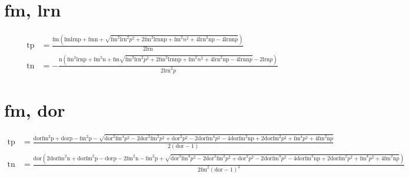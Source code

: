 \documentclass[3p,times]{elsarticle}
\begin{document}
\begin{footnotesize}
\begin{landscape}
\section{fm, lrn}
\begin{align}
\mathrm{tp} &= \frac{\mathrm{fm} \left(\mathrm{fm} \mathrm{lrn} \mathrm{p} + \mathrm{fm} \mathrm{n} + \sqrt{\mathrm{fm}^{2} \mathrm{lrn}^{2} p^{2} + 2 \mathrm{fm}^{2} \mathrm{lrn} \mathrm{n} \mathrm{p} + \mathrm{fm}^{2} n^{2} + 4 \mathrm{lrn}^{2} \mathrm{n} \mathrm{p} - 4 \mathrm{lrn} \mathrm{n} p}\right)}{2 \mathrm{lrn}}\\
\mathrm{tn} &= - \frac{\mathrm{n} \left(\mathrm{fm}^{2} \mathrm{lrn} \mathrm{p} + \mathrm{fm}^{2} \mathrm{n} + \mathrm{fm} \sqrt{\mathrm{fm}^{2} \mathrm{lrn}^{2} p^{2} + 2 \mathrm{fm}^{2} \mathrm{lrn} \mathrm{n} \mathrm{p} + \mathrm{fm}^{2} n^{2} + 4 \mathrm{lrn}^{2} \mathrm{n} \mathrm{p} - 4 \mathrm{lrn} \mathrm{n} p} - 2 \mathrm{lrn} p\right)}{2 \mathrm{lrn}^{2} p}
\end{align}
\section{fm, dor}
\begin{align}
\mathrm{tp} &= \frac{\mathrm{dor} \mathrm{fm}^{2} \mathrm{p} + \mathrm{dor} \mathrm{p} - \mathrm{fm}^{2} \mathrm{p} - \sqrt{\mathrm{dor}^{2} \mathrm{fm}^{4} p^{2} - 2 \mathrm{dor}^{2} \mathrm{fm}^{2} p^{2} + \mathrm{dor}^{2} p^{2} - 2 \mathrm{dor} \mathrm{fm}^{4} p^{2} - 4 \mathrm{dor} \mathrm{fm}^{2} \mathrm{n} \mathrm{p} + 2 \mathrm{dor} \mathrm{fm}^{2} p^{2} + \mathrm{fm}^{4} p^{2} + 4 \mathrm{fm}^{2} \mathrm{n} p}}{2 \left(\mathrm{dor} - 1\right)}\\
\mathrm{tn} &= \frac{\mathrm{dor} \left(2 \mathrm{dor} \mathrm{fm}^{2} \mathrm{n} + \mathrm{dor} \mathrm{fm}^{2} \mathrm{p} - \mathrm{dor} \mathrm{p} - 2 \mathrm{fm}^{2} \mathrm{n} - \mathrm{fm}^{2} \mathrm{p} + \sqrt{\mathrm{dor}^{2} \mathrm{fm}^{4} p^{2} - 2 \mathrm{dor}^{2} \mathrm{fm}^{2} p^{2} + \mathrm{dor}^{2} p^{2} - 2 \mathrm{dor} \mathrm{fm}^{4} p^{2} - 4 \mathrm{dor} \mathrm{fm}^{2} \mathrm{n} \mathrm{p} + 2 \mathrm{dor} \mathrm{fm}^{2} p^{2} + \mathrm{fm}^{4} p^{2} + 4 \mathrm{fm}^{2} \mathrm{n} p}\right)}{2 \mathrm{fm}^{2} \left(\mathrm{dor} - 1\right)^{2}}
\end{align}

\end{landscape}
\end{footnotesize}
\end{document}

